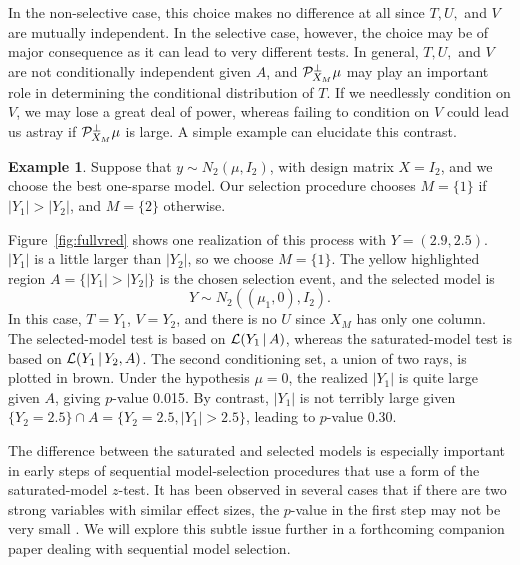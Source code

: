 \documentclass{article}
\theoremstyle{definition}
\newtheorem{example}{Example}
\newcommand{\bX}{X}
\newcommand{\proj}{\cP}
\newcommand{\cL}{\mathcal{L}}
\begin{document}
In the non-selective case, this choice makes no difference at all since $T, U,$ and $V$ are mutually independent.
In the selective case, however, the choice may be of major consequence as it can lead to very different tests. In general, $T, U,$ and $V$ are not conditionally independent given $A$, and $\proj_{\bX_M}^\perp \mu$ may play an important role in determining the conditional distribution of $T$. If we needlessly condition on $V$, we may lose a great deal of power, whereas failing to condition on $V$ could lead us astray if $\proj_{\bX_M}^\perp \mu$ is large. A simple example can elucidate this contrast.

\begin{example}\label{ex:bivar}
  Suppose that $y\sim N_2(\mu, I_2)$, with design matrix $\bX = I_2$, and we choose the best one-sparse model. Our selection procedure chooses $M=\{1\}$ if $|Y_1|>|Y_2|$, and $M=\{2\}$ otherwise.

Figure~\ref{fig:fullvred} shows one realization of this process with $Y=(2.9,2.5)$. $|Y_1|$ is a little larger than $|Y_2|$, so we choose $M=\{1\}$. The yellow highlighted region $A=\{|Y_1|>|Y_2|\}$ is the chosen selection event, and the selected model is
\begin{equation}
  Y \sim N_2\left((\mu_1,0), I_2\right).
\end{equation}
In this case, $T=Y_1$, $V=Y_2$, and there is no $U$ since $\bX_M$ has only one column. The selected-model test is based on $\cL(Y_1 \gv A)$, whereas the saturated-model test is based on $\cL(Y_1 \gv Y_2, A)$. The second conditioning set, a union of two rays, is plotted in brown. Under the hypothesis $\mu=0$, the realized $|Y_1|$ is quite large given $A$, giving $p$-value 0.015. By contrast, $|Y_1|$ is not terribly large given $\{Y_2=2.5\}\cap A = \{Y_2=2.5, |Y_1|>2.5\}$, leading to $p$-value 0.30.
\end{example}

The difference between the saturated and selected models is especially important in early steps of sequential model-selection procedures that use a form of the saturated-model $z$-test. It has been observed in several cases that if there are two strong variables with similar effect sizes, the $p$-value in the first step may not be very small \citep{taylor2014post,g2013adaptive}. We will explore this subtle issue further in a forthcoming companion paper dealing with sequential model selection.
\end{document}
